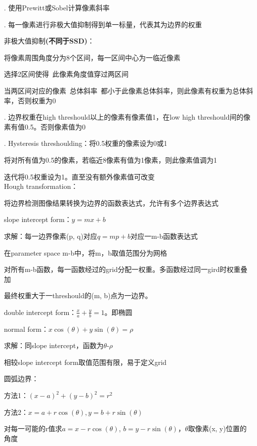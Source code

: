 \documentclass[UTF8]{ctexart}
\begin{document}
  . 使用Prewitt或Sobel计算像素斜率

  . 每一像素进行非极大值抑制得到单一标量，代表其为边界的权重

  \quad \quad 非极大值抑制\textbf{(不同于SSD)}：

  \quad \quad \quad 将像素周围角度分为8个区间，每一区间中心为一临近像素

  \quad \quad \quad 选择2区间使得\ 此像素角度值穿过两区间

  \quad \quad \quad 当两区间对应的像素\ 总体斜率\ 都小于此像素总体斜率，则此像素有权重为总体斜率，否则权重为0

  . 边界权重在high threshould以上的像素有像素值1，在low high threshould间的像素有值0.5。否则像素值为0

  . Hysteresis threshoulding：将0.5权重的像素设为0或1
  
  \quad \quad 将对所有值为0.5的像素，若临近8像素有值为1像素，则此像素值调为1

  \quad \quad 迭代将0.5权重设为1。直至没有额外像素值可改变\\
Hough transformation：

  将边界检测图像结果转换为边界的函数表达式，允许有多个边界表达式

  \quad slope intercept form：$y = mx + b$

  \quad \quad 求解：每一边界像素(p, q)对应$q = mp + b$对应一m-b函数表达式

  \quad \quad \quad 在parameter space m-b中，将m，b取值范围分为网格

  \quad \quad \quad 对所有m-b函数，每一函数经过的grid分配一权重。多函数经过同一gird时权重叠加
  
  \quad \quad \quad 最终权重大于一threshould的(m, b)点为一边界。

  \quad double intercept form：$\frac{x}{a} + \frac{y}{b} = 1$。即椭圆

  \quad normal form：$x\cos(\theta) + y\sin(\theta) = \rho$

  \quad \quad 求解：同slope intercept，函数为$\theta$-$\rho$

  \quad \quad 相较slope intercept form取值范围有限，易于定义grid

  \quad 圆弧边界：

  \quad \quad 方法1：$(x - a)^2 + (y - b)^2 = r^2$

  \quad \quad 方法2：$x = a + r\cos(\theta), y = b + r\sin(\theta)$
  
  \quad \quad \quad 对每一可能的r值求$a = x - r\cos(\theta)$, $b = y - r\sin(\theta)$，$\theta$取像素(x, y)位置的角度
\end{document}
